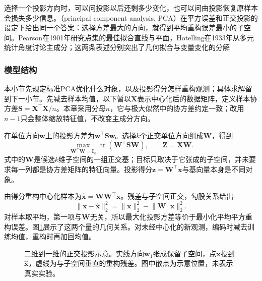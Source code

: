 选择一个投影方向时，可以问投影以后还剩多少变化，也可以问由投影恢复原样本会损失多少信息。（principal component analysis, PCA）在平方误差和正交投影的设定下给出同一个答案：选择方差最大的方向，就得到平均重构误差最小的子空间。Pearson在1901年研究点集的最佳拟合直线与平面，Hotelling在1933年从多元统计角度讨论主成分；这两条表述分别突出了几何拟合与变量变化的分解

\subsubsection{模型结构}
\label{sec:dim-pca-structure}

本小节先规定标准PCA优化什么对象，以及投影得分怎样重构观测；具体求解留到下一小节。先减去样本均值，以下暂以$\bm{X}$表示中心化后的数据矩阵，定义样本协方差$\bm{S}=\bm{X}^{\top}\bm{X}/n$。本章采用分母$n$，它与极大似然中的协方差约定一致；改用$n-1$只会整体缩放特征值，不改变主成分方向。

在单位方向$\bm{w}$上的投影方差为$\bm{w}^{\top}\bm{S}\bm{w}$。选择$k$个正交单位方向组成$\bm{W}$，得到
\begin{equation}
  \max_{\bm{W}^{\top}\bm{W}=\bm{I}_k}
      \operatorname{tr}(\bm{W}^{\top}\bm{S}\bm{W}),
  \qquad \bm{Z}=\bm{X}\bm{W}.
  \label{eq:dim-pca-variance}
\end{equation}
式中的$\bm{W}$是候选$k$维子空间的一组正交基；目标只取决于它张成的子空间，并未要求每一列都是协方差矩阵的特征向量。投影得分$\bm{z}=\bm{W}^{\top}\bm{x}$与基向量本身是不同对象。

由得分重构中心化样本为$\widehat{\bm{x}}=\bm{W}\bm{W}^{\top}\bm{x}$。残差与子空间正交，勾股关系给出
\begin{equation}
  \lVert\bm{x}-\widehat{\bm{x}}\rVert_2^2
  =\lVert\bm{x}\rVert_2^2-\lVert\bm{W}^{\top}\bm{x}\rVert_2^2.
  \label{eq:dim-pca-pythagoras}
\end{equation}
对样本取平均，第一项与$\bm{W}$无关，所以最大化投影方差等价于最小化平均平方重构误差。图\ref{fig:dim-pca-projection}展示了这两个量的几何关系。对未经中心化的新观测，编码时减去训练均值，重构时再加回均值。

\begin{figure}[htbp]
  \centering
  
  \caption{二维到一维的正交投影示意。实线方向$\bm{w}_1$张成保留子空间，点$\bm{x}$投到$\widehat{\bm{x}}$，虚线为与子空间垂直的重构残差。图中散点为示意位置，未表示真实实验。}
  \label{fig:dim-pca-projection}
\end{figure}

